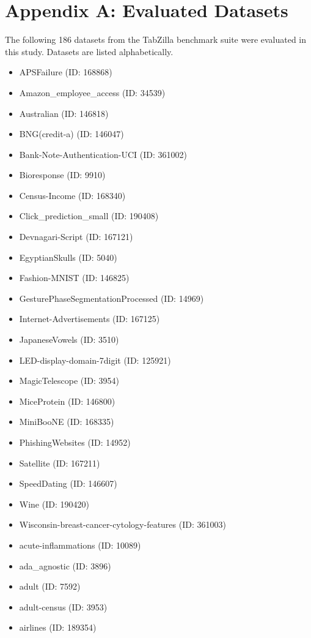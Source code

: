\section{Appendix A: Evaluated Datasets}

The following 186 datasets from the TabZilla benchmark suite were evaluated in this study. Datasets are listed alphabetically.

\begin{itemize}
  \setlength\itemsep{0em}
  \item APSFailure (ID: 168868)
  \item Amazon\_employee\_access (ID: 34539)
  \item Australian (ID: 146818)
  \item BNG(credit-a) (ID: 146047)
  \item Bank-Note-Authentication-UCI (ID: 361002)
  \item Bioresponse (ID: 9910)
  \item Census-Income (ID: 168340)
  \item Click\_prediction\_small (ID: 190408)
  \item Devnagari-Script (ID: 167121)
  \item EgyptianSkulls (ID: 5040)
  \item Fashion-MNIST (ID: 146825)
  \item GesturePhaseSegmentationProcessed (ID: 14969)
  \item Internet-Advertisements (ID: 167125)
  \item JapaneseVowels (ID: 3510)
  \item LED-display-domain-7digit (ID: 125921)
  \item MagicTelescope (ID: 3954)
  \item MiceProtein (ID: 146800)
  \item MiniBooNE (ID: 168335)
  \item PhishingWebsites (ID: 14952)
  \item Satellite (ID: 167211)
  \item SpeedDating (ID: 146607)
  \item Wine (ID: 190420)
  \item Wisconsin-breast-cancer-cytology-features (ID: 361003)
  \item acute-inflammations (ID: 10089)
  \item ada\_agnostic (ID: 3896)
  \item adult (ID: 7592)
  \item adult-census (ID: 3953)
  \item airlines (ID: 189354)

\end{itemize}
